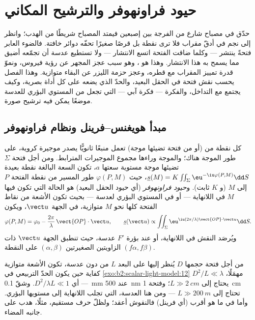 \chapter{حيود فراونهوفر والترشيح المكاني}\label{ch:b2:diffraction}

حدّق في مصباح شارع من الفرجة بين إصبعين فيمتد
المصباح شريطًا من الهدب؛ وانظر إلى نجم في أدقّ
مقراب فلا ترى نقطة بل قرصًا صغيرًا تحفّه دوائر
خافتة. فالضوء العابر فتحةً ينتشر --- وكلما ضاقت
الفتحة اتسع الانتشار --- ولا تستطيع عدسة أن تجمّعه
أضيق مما يسمح به هذا الانتشار. وهذا هو \emph{}، وهو سبب
عجز المجهر عن رؤية فيروس، ونموّ قدرة تمييز المقراب
مع قطره، وعجز حزمة الليزر عن البقاء متوازية. وهذا الفصل
يحسب نقش  فتحة في الحقل البعيد، والحدّ
الذي يضعه على كل أداة بصرية، وكيف يجتمع مع
التداخل، والفكرة --- فكرة آبي --- التي تجعل من المستوي البؤري
للعدسة موضعًا يمكن فيه ترشيح صورة.

\section{مبدأ هويغنس--فرينل ونظام فراونهوفر}

\begin{definition}\label{def:b2:diffraction:huygens}
كل نقطة من  (أو من فتحة تضيئها موجة) تعمل
منبعًا ثانويًّا يصدر موجيرة كروية، على طور الموجة
هناك؛ والموجة وراءها مجموع الموجيرات المترابط. ومن أجل
فتحة $\Sigma$ تضيئها موجة مستوية سعتها $a$، تكون السعة
البالغة نقطة بعيدة $\underline s(M) = K\iint_\Sigma\eu^{-\iu\varphi(P, M)}\dd S$، حيث
$\varphi(P, M)$ طور المسير من نقطة الفتحة $P$ إلى $M$
(و $K$ ثابت). و\emph{حيود فراونهوفر} (أي حيود الحقل البعيد) هو الحالة
التي تكون فيها $M$ في اللانهاية --- أو في المستوي البؤري لعدسة --- بحيث
تكون الأشعة من نقاط الفتحة كلها نحو $M$ متوازية، في
الجهة $\vect u$، ويكون
\[
\varphi(P, M) = \varphi_0 - \frac{2\pi}\lambda\,\vect{OP}\cdot\vect u , \qquad
\underline s(\vect u) \propto \iint_\Sigma\eu^{\iu(2\pi/\lambda)\vect{OP}\cdot\vect u}\dd S .
\]
ويُرصَد النقش في اللانهاية، أو عند بؤرة $F'$ عدسة،
حيث تنطبق الجهة $\vect u$ ذات الزاويتين الصغيرتين $(\alpha, \beta)$ على
النقطة $(f\alpha, f\beta)$.
\end{definition}
\admitted

\begin{remark}\label{rem:b2:diffraction:fresnelnumber}
من أجل فتحة حجمها $D$ يُنظر إليها على البعد $L$ من دون عدسة، تكون
الأشعة متوازية كفاية حين يكون الحدّ التربيعي في
\cref{exo:b2:scalar-light-model:12} مهمَلًا، $D^2/L \ll \lambda$ ---
أي \emph{} $D^2/\lambda L \ll 1$. وشقّ \qty{0.1}{mm} عند
\qty{500}{nm} يحتاج إلى $L \gg \qty{2}{cm}$؛ وفتحة \qty{1}{cm} تحتاج إلى $L \gg \qty{200}{m}$ ---
ومن هنا العدسة، التي تجلب اللانهاية إلى مستويها البؤري. وأما في ما هو أقرب
(أي  فرينل) فالنقوش أعقد؛ ولظلّ
حرف مستقيم، مثلًا، هدب على جانبه المضاء.
\end{remark}

